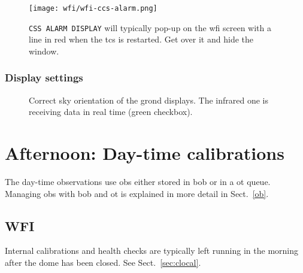 \documentclass[11pt,fleqn]{book} %
\begin{document}
\begin{figure}[ht!]
\centering
\texttt{[image: wfi/wfi-ccs-alarm.png]}
\caption[Harmless alarm display on WFI during TCS restart]{\texttt{CSS ALARM DISPLAY} will typically pop-up on the \gls{wfi}
screen with a line in red when the \gls{tcs} is restarted.  Get over it and
hide the window.}
\label{fig:wfialarm}
\end{figure}

\subsection{Display settings}
\begin{figure}[ht!]
\null\hfil
{}%
\hfil
{}
\hfil\null
\caption[Correct sky orientation of the GROND displays]{Correct sky orientation of the \gls{grond} displays. The infrared one
is receiving data in real time (green checkbox).}
\end{figure}




\chapter{Afternoon: Day-time calibrations}
\label{daycal}

The day-time observations use \glspl{ob} either stored in \gls{bob} or in a
\gls{ot} queue.  Managing \glspl{ob} with \gls{bob} and \gls{ot} is
explained in more detail in Sect.~\ref{ob}.

\section{WFI}
Internal calibrations and health checks are typically left running in the morning after the dome has been closed.  See Sect.~\ref{sec:clocal}.
\end{document}
